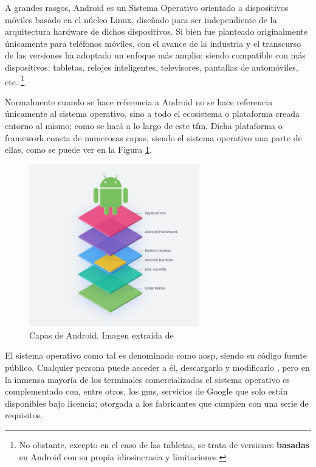         A grandes rasgos, Android es un Sistema Operativo orientado a dispositivos móviles basado en el núcleo Linux, diseñado para ser independiente de la arquitectura hardware de dichos dispositivos. Si bien fue planteado originalmente únicamente para teléfonos móviles, con el avance de la industria y el transcurso de las versiones ha adoptado un enfoque más amplio; siendo compatible con más dispositivos: tabletas, relojes inteligentes, televisores, pantallas de automóviles, etc. \footnote{No obstante, excepto en el caso de las tabletas, se trata de versiones \textbf{basadas} en Android con su propia 
        idiosincrasia y limitaciones.}
  
        Normalmente cuando se hace referencia a Android no se hace referencia únicamente al sistema operativo, sino a todo el ecosistema o plataforma creada entorno al mismo; como se hará a lo largo de este \gls{tfm}. Dicha plataforma o 
        \gls{framework} consta de numerosas capas, siendo el sistema operativo una parte de ellas, como se puede ver en la Figura \ref{figure:android:capas}. 

        \begin{figure}[h]
            \centering
            \includegraphics[width=0.66\textwidth]{figures/Android capas.jpg}
            \caption[Capas de Android]
            {Capas de Android. Imagen extraída de \cite{perez_aosp_2019}}
            \label{figure:android:capas}
        \end{figure}
        
        El sistema operativo como tal es denominado como \gls{aosp}, siendo su código fuente público. Cualquier persona puede acceder a él, descargarlo y modificarlo \cite{collado_que_2022}, pero en la inmensa mayoría de los terminales comercializados el sistema operativo es complementado con, entre otros, los \gls{gms}, servicios de Google que solo están disponibles bajo licencia; otorgada a los fabricantes que cumplen con una serie de requisitos. 


